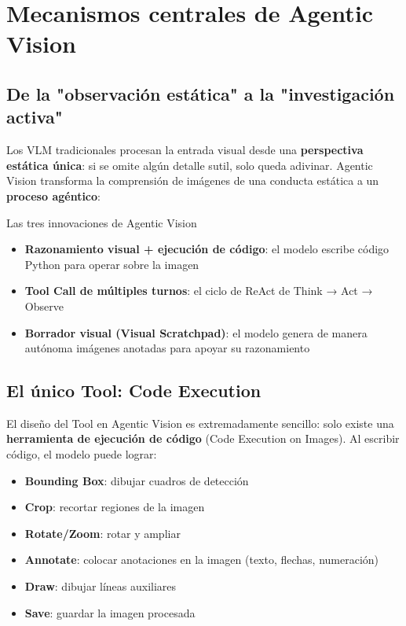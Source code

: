 \section{Mecanismos centrales de Agentic Vision}

\subsection{De la "observación estática" a la "investigación activa"}

Los VLM tradicionales procesan la entrada visual desde una \textbf{perspectiva estática única}: si se omite algún detalle sutil, solo queda adivinar. Agentic Vision transforma la comprensión de imágenes de una conducta estática a un \textbf{proceso agéntico}:

\begin{importantbox}{Las tres innovaciones de Agentic Vision}
\begin{itemize}
    \item \textbf{Razonamiento visual + ejecución de código}: el modelo escribe código Python para operar sobre la imagen
    \item \textbf{Tool Call de múltiples turnos}: el ciclo de ReAct de Think → Act → Observe
    \item \textbf{Borrador visual (Visual Scratchpad)}: el modelo genera de manera autónoma imágenes anotadas para apoyar su razonamiento
\end{itemize}
\end{importantbox}

\subsection{El único Tool: Code Execution}

El diseño del Tool en Agentic Vision es extremadamente sencillo: solo existe una \textbf{herramienta de ejecución de código} (Code Execution on Images). Al escribir código, el modelo puede lograr:

\begin{itemize}
    \item \textbf{Bounding Box}: dibujar cuadros de detección
    \item \textbf{Crop}: recortar regiones de la imagen
    \item \textbf{Rotate/Zoom}: rotar y ampliar
    \item \textbf{Annotate}: colocar anotaciones en la imagen (texto, flechas, numeración)
    \item \textbf{Draw}: dibujar líneas auxiliares
    \item \textbf{Save}: guardar la imagen procesada
\end{itemize}

